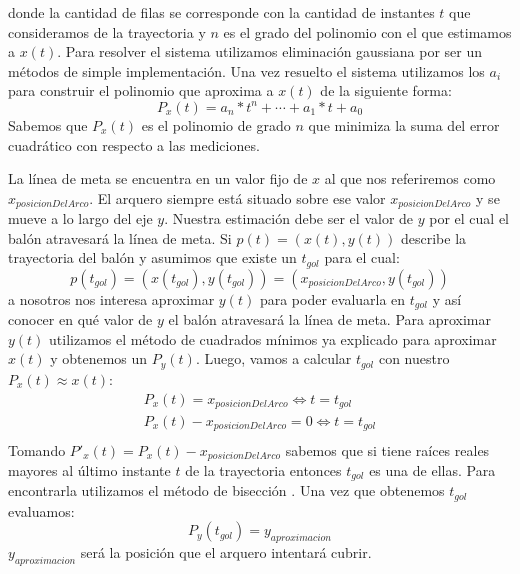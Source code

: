 donde la cantidad de filas se corresponde con la cantidad de instantes $t$ que consideramos de la trayectoria y $n$ es el grado del 
polinomio con el que estimamos a $x(t)$. Para resolver el sistema utilizamos eliminación gaussiana por ser un métodos de simple
implementación. Una vez resuelto el sistema utilizamos los $a_i$ para construir el polinomio que aproxima a $x(t)$ de la siguiente forma:
\begin{displaymath}
P_x(t)=a_n*t^n + \cdots + a_1*t + a_0 
\end{displaymath}
Sabemos que $P_x(t)$ es el polinomio de grado $n$ que minimiza la suma del error cuadrático con respecto a las mediciones. 
\par
La línea de meta se encuentra en un valor fijo de $x$ al que nos referiremos como $x_{posicionDelArco}$. El arquero siempre está 
situado sobre ese valor $x_{posicionDelArco}$ y se mueve a lo largo del eje $y$. Nuestra estimación debe ser el valor de $y$ por el
cual el balón atravesará la línea de meta. Si $p(t) = (x(t), y(t))$ describe la trayectoria del balón y asumimos que existe un $t_{gol}$ para el 
cual:
\begin{displaymath}
  p(t_{gol}) = (x(t_{gol}), y(t_{gol})) = (x_{posicionDelArco}, y(t_{gol}))
\end{displaymath}
a nosotros nos interesa aproximar $y(t)$ para poder evaluarla en $t_{gol}$ y así conocer en qué valor de $y$ el balón atravesará la línea
de meta. Para aproximar $y(t)$ utilizamos el método de cuadrados mínimos ya explicado para aproximar $x(t)$ y obtenemos un $P_y(t)$. Luego,
vamos a calcular $t_{gol}$ con nuestro $P_x(t) \approx x(t)$:
\begin{align}
    P_x(t) = x_{posicionDelArco}  \Longleftrightarrow t = t_{gol}\\
    P_x(t) - x_{posicionDelArco} = 0 \Longleftrightarrow t = t_{gol}\\
\end{align}
Tomando $P'_x(t) = P_x(t) - x_{posicionDelArco}$ sabemos que si tiene raíces reales mayores al último instante $t$ de la trayectoria 
entonces $t_{gol}$ es una de ellas. Para encontrarla utilizamos el método de bisección \cite[]{BoostSite}. Una vez que obtenemos 
$t_{gol}$ evaluamos: 
\begin{displaymath}
  P_y(t_{gol}) = y_{aproximacion}
\end{displaymath}
$y_{aproximacion}$ será la posición que el arquero intentará cubrir.
\par

